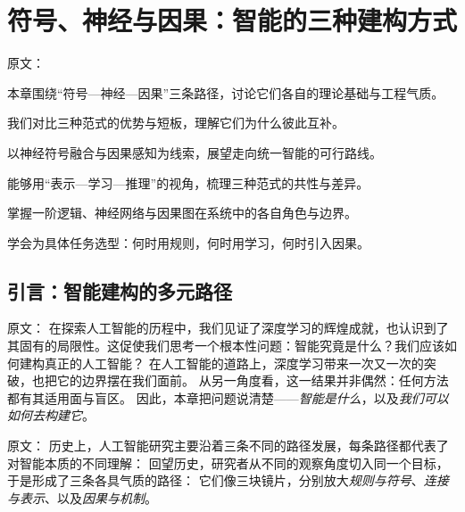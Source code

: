 \chapter{符号、神经与因果：智能的三种建构方式}

原文：
\begin{introduction}
  \item 本章围绕“符号—神经—因果”三条路径，讨论它们各自的理论基础与工程气质。
  \item 我们对比三种范式的优势与短板，理解它们为什么彼此互补。
  \item 以神经符号融合与因果感知为线索，展望走向统一智能的可行路线。
\end{introduction}

\begin{introduction}
  \item 能够用“表示—学习—推理”的视角，梳理三种范式的共性与差异。
  \item 掌握一阶逻辑、神经网络与因果图在系统中的各自角色与边界。
  \item 学会为具体任务选型：何时用规则，何时用学习，何时引入因果。
\end{introduction}


\section{引言：智能建构的多元路径}

原文：
在探索人工智能的历程中，我们见证了深度学习的辉煌成就，也认识到了其固有的局限性。这促使我们思考一个根本性问题：智能究竟是什么？我们应该如何建构真正的人工智能？
在人工智能的道路上，深度学习带来一次又一次的突破，也把它的边界摆在我们面前。  
从另一角度看，这一结果并非偶然：任何方法都有其适用面与盲区。  
因此，本章把问题说清楚——\emph{智能是什么}，以及\emph{我们可以如何去构建它}。

原文：
历史上，人工智能研究主要沿着三条不同的路径发展，每条路径都代表了对智能本质的不同理解：
回望历史，研究者从不同的观察角度切入同一个目标，于是形成了三条各具气质的路径：  
它们像三块镜片，分别放大\emph{规则与符号}、\emph{连接与表示}、以及\emph{因果与机制}。

